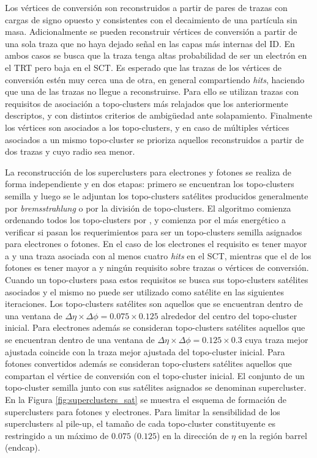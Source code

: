 Los vértices de conversión son reconstruidos a partir de pares de trazas con cargas de signo opuesto y consistentes con el decaimiento de una partícula sin masa. Adicionalmente se pueden reconstruir vértices de conversión a partir de una sola traza que no haya dejado señal en las capas más internas del ID. En ambos casos se busca que la traza tenga altas probabilidad de ser un electrón en el TRT \cite{ATLAS-CONF-2011-128} pero baja en el SCT. Es esperado que las trazas de los vértices de conversión estén muy cerca una de otra, en general compartiendo \textit{hits}, haciendo que una de las trazas no llegue a reconstruirse. Para ello se utilizan trazas con requisitos de asociación a topo-clusters más relajados que los anteriormente descriptos, y con distintos criterios de ambigüedad ante solapamiento. Finalmente los vértices son asociados a los topo-clusters, y en caso de múltiples vértices asociados a un mismo topo-cluster se prioriza aquellos reconstruidos a partir de dos trazas y cuyo radio sea menor.



La reconstrucción de los superclusters para electrones y fotones se realiza de forma independiente y en dos etapas: primero se encuentran los topo-clusters semilla 
y luego se le adjuntan los topo-clusters satélites producidos generalmente por \textit{bremsstrahlung} o por la división de topo-clusters. El algoritmo comienza ordenando todos los topo-clusters por \ET, y comienza por el más energético a verificar si pasan los requerimientos para ser un topo-clusters semilla asignados para electrones o fotones. En el caso de los electrones el requisito es tener \ET mayor a  y una traza asociada con al menos cuatro \textit{hits} en el SCT, mientras que el de los fotones es tener \ET mayor a  y ningún requisito sobre trazas o vértices de conversión. Cuando un topo-clusters pasa estos requisitos se busca sus topo-clusters satélites asociados y el mismo no puede ser utilizado como satélite en las siguientes iteraciones. Los topo-clusters satélites son aquellos que se encuentran dentro de una ventana de $\Delta\eta\times\Delta\phi=0.075\times0.125$ alrededor del centro del topo-cluster inicial. Para electrones además se consideran topo-clusters satélites aquellos que se encuentran dentro de una ventana de $\Delta\eta\times\Delta\phi=0.125\times0.3$ cuya traza mejor ajustada coincide con la traza mejor ajustada del topo-cluster inicial. Para fotones convertidos además se consideran topo-clusters satélites aquellos que compartan el vértice de conversión con el topo-cluster inicial. El conjunto de un topo-cluster semilla junto con sus satélites asignados se denominan supercluster. En la Figura \ref{fig:superclusters_sat} se muestra el esquema de formación de superclusters para fotones y electrones. Para limitar la sensibilidad de los superclusters al pile-up, el tamaño de cada topo-cluster constituyente es restringido a un máximo de $0.075$ ($0.125$) en la dirección de $\eta$  en la región barrel (endcap). 


